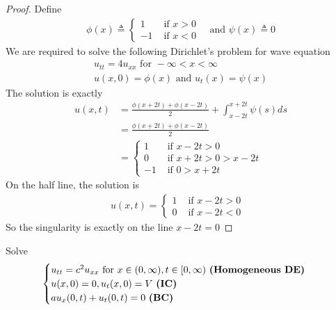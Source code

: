 \documentclass{report}
\begin{document}
\begin{proof}
Define 
\begin{align*}
\phi (x)\triangleq \begin{cases}
  1& \text{ if $x>0$ }\\
  -1& \text{ if $x<0$ }
\end{cases}\text{ and }\psi (x)\triangleq 0
\end{align*}
We are required to solve the following Dirichlet's problem for wave equation 
\begin{align*}
u_{tt}=4u_{xx}\text{ for }-\infty < x< \infty \\
u(x,0)=\phi (x)\text{ and }u_t(x)=\psi (x)
\end{align*}
The solution is exactly 
\begin{align*}
u(x,t)&=\frac{\phi(x+2t)+\phi (x-2t)}{2}+\int_{x-2t}^{x+2t} \psi (s)ds \\
&=\frac{\phi (x+2t)+\phi (x-2t)}{2}\\
&=\begin{cases}
  1& \text{ if $x-2t>0$ }\\
  0& \text{ if  }x+2t>0>x-2t\\
  -1& \text{ if  }0>x+2t
\end{cases}
\end{align*}
On the half line, the solution is 
\begin{align*}
u(x,t)=\begin{cases}
  1& \text{ if $x-2t>0$ }\\
  0& \text{ if $x-2t<0$ }
\end{cases}
\end{align*}
So the singularity is exactly on the line $x-2t=0$ 
\end{proof}
\begin{question}{}{}
Solve 
\begin{align*}
\begin{cases}  
u_{tt}=c^2u_{xx}\text{ for }x\in (0,\infty),t\in [0,\infty)\text{ \textbf{(Homogeneous DE)} }\\
u(x,0)=0,u_t(x,0)=V\text{ \textbf{(IC)} }\\
au_x(0,t)+u_t(0,t)=0\text{ \textbf{(BC)} }
\end{cases}
\end{align*}
\end{question}
\end{document}
